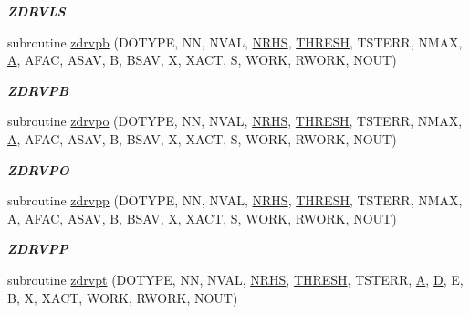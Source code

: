 \begin{DoxyCompactItemize}
\begin{DoxyCompactList}\small\item\em {\bfseries Z\+D\+R\+V\+L\+S} \end{DoxyCompactList}\item 
subroutine \hyperlink{group__complex16__lin_ga084dd84c46d4f65bc024bb2aaf4c9562}{zdrvpb} (D\+O\+T\+Y\+P\+E, N\+N, N\+V\+A\+L, \hyperlink{example__user_8c_aa0138da002ce2a90360df2f521eb3198}{N\+R\+H\+S}, \hyperlink{zlaqgs_8c_a0656018abfc9fa2821827415f5d5ea57}{T\+H\+R\+E\+S\+H}, T\+S\+T\+E\+R\+R, N\+M\+A\+X, \hyperlink{classA}{A}, A\+F\+A\+C, A\+S\+A\+V, B, B\+S\+A\+V, X, X\+A\+C\+T, S, W\+O\+R\+K, R\+W\+O\+R\+K, N\+O\+U\+T)
\begin{DoxyCompactList}\small\item\em {\bfseries Z\+D\+R\+V\+P\+B} \end{DoxyCompactList}\item 
subroutine \hyperlink{group__complex16__lin_gab2fad22f8c643c5137f11939c9b9c71a}{zdrvpo} (D\+O\+T\+Y\+P\+E, N\+N, N\+V\+A\+L, \hyperlink{example__user_8c_aa0138da002ce2a90360df2f521eb3198}{N\+R\+H\+S}, \hyperlink{zlaqgs_8c_a0656018abfc9fa2821827415f5d5ea57}{T\+H\+R\+E\+S\+H}, T\+S\+T\+E\+R\+R, N\+M\+A\+X, \hyperlink{classA}{A}, A\+F\+A\+C, A\+S\+A\+V, B, B\+S\+A\+V, X, X\+A\+C\+T, S, W\+O\+R\+K, R\+W\+O\+R\+K, N\+O\+U\+T)
\begin{DoxyCompactList}\small\item\em {\bfseries Z\+D\+R\+V\+P\+O} \end{DoxyCompactList}\item 
subroutine \hyperlink{group__complex16__lin_ga43d103e2ff555e377504128efe9220a1}{zdrvpp} (D\+O\+T\+Y\+P\+E, N\+N, N\+V\+A\+L, \hyperlink{example__user_8c_aa0138da002ce2a90360df2f521eb3198}{N\+R\+H\+S}, \hyperlink{zlaqgs_8c_a0656018abfc9fa2821827415f5d5ea57}{T\+H\+R\+E\+S\+H}, T\+S\+T\+E\+R\+R, N\+M\+A\+X, \hyperlink{classA}{A}, A\+F\+A\+C, A\+S\+A\+V, B, B\+S\+A\+V, X, X\+A\+C\+T, S, W\+O\+R\+K, R\+W\+O\+R\+K, N\+O\+U\+T)
\begin{DoxyCompactList}\small\item\em {\bfseries Z\+D\+R\+V\+P\+P} \end{DoxyCompactList}\item 
subroutine \hyperlink{group__complex16__lin_ga56c9d78521095c6480bbb925c269ecc0}{zdrvpt} (D\+O\+T\+Y\+P\+E, N\+N, N\+V\+A\+L, \hyperlink{example__user_8c_aa0138da002ce2a90360df2f521eb3198}{N\+R\+H\+S}, \hyperlink{zlaqgs_8c_a0656018abfc9fa2821827415f5d5ea57}{T\+H\+R\+E\+S\+H}, T\+S\+T\+E\+R\+R, \hyperlink{classA}{A}, \hyperlink{odrpack_8h_a7dae6ea403d00f3687f24a874e67d139}{D}, E, B, X, X\+A\+C\+T, W\+O\+R\+K, R\+W\+O\+R\+K, N\+O\+U\+T)

\end{DoxyCompactItemize}
